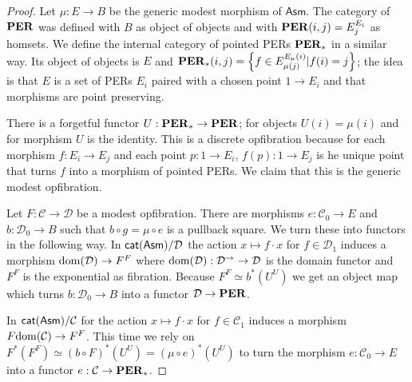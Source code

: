 \documentclass{amsart}
\theoremstyle{plain}
\theoremstyle{definition}
\newcommand\hide[1]{}
\newcommand\cat\mathcal
\newcommand\set[1]{\left\{#1\right\}}
\newcommand\ri{^*}
\newcommand\Asm{\mathsf{Asm}}
\begin{document}
\begin{proof} Let $\mu:E\to B$ be the generic modest morphism of $\Asm$. The category of $\mathbf{PER}$ was defined with $B$ as object of objects and with $\mathbf{PER}(i,j) = E_j^{E_i}$ as homsets. We define the internal category of pointed PERs $\mathbf{PER}_*$ in a similar way. Its object of objects is $E$ and $\pers_*(i,j) = \set{f\in E_{\mu(j)}^{E_\mu(i)}| f(i)=j}$; the idea is that $E$ is a set of PERs $E_i$ paired with a chosen point $1\to E_i$ and that morphisms are point preserving.

There is a forgetful functor $U:\mathbf{PER}_* \to \mathbf{PER}$; for objects $U(i) = \mu(i)$ and for morphism $U$ is the identity. This is a discrete opfibration because for each morphism $f:E_i \to E_j$ and each point $p:1\to E_i$, $f(p):1\to E_j$ is he unique point that turns $f$ into a morphism of pointed PERs. We claim that this is the generic modest opfibration.

Let $F:\cat C\to \cat D$ be a modest opfibration. There are morphisms $e:\cat C_0\to E$ and $b:\cat D_0\to B$ such that $b\circ g = \mu\circ e$ is a pullback square. We turn these into functors in the following way. In $\catasm/\cat D$  the action $x\mapsto f\cdot x$ for $f\in \cat D_1$ induces a morphism $\dom(\cat D) \to F^F$ where $\dom(\cat D):\cat D^{\to}\to\cat D$ is the domain functor and $F^F$ is the exponential as fibration. Because $F^F \simeq b\ri(U^U)$ we get an object map which turns $b:\cat D_0\to B$ into a functor $\cat D\to\pers$.

In $\catasm/\cat C$ for the action $x\mapsto f\cdot x$ for $f\in \cat C_1$ induces a morphism $F\dom(\cat C) \to F^F$. This time we rely on $F\ri(F^F) \simeq (b\circ F)\ri(U^U) = (\mu\circ e)\ri(U^U)$ to turn the morphism $e:\cat C_0\to E$ into a functor $e:\cat C\to \pers_*$.

\hide{
Similarly, for $g\in \cat C_1$, $(g,x)\mapsto Fg\cdot x$ induces a morphism $\cat C_1 \to $
a morphism $g:k\to l$ in $\cat C$ induces a morphism $Fg\cdot:\cat C_{F(k)} \to \cat C_{F(l)}$ such that $Fg\cdot k=l$. Note that for each object $i$ of $\cat D$, $e_i:X_i \to E_{b(i)}$ is a fibred isomorphism because the square is a pullback. We define functors $b:\cat D \to \pers_*$ and $e:\cat C \to \pers_*$ by sending each morphisms to the unique morphism that commute with the $e_i$.
\[\xymatrix{
\cat C_i \ar[d]_{f\cdot} \ar[r]^{e_i} & E_{b(i)} \ar@{.>}[d]^{b(f)} && \cat C_{F(k)} \ar[d]_{g\cdot} \ar[r]^{e_{F(k)}} & E_{\mu(e(k))} \ar@{.>}[d]^{e(g)} \\
\cat C_j \ar[r]_{e_j} & E_{b(j)} && \cat C_{F(l)} \ar[r]_{e_{F(l)}} & E_{\mu(e(l))}
}\]
}


\end{proof}
\end{document}
